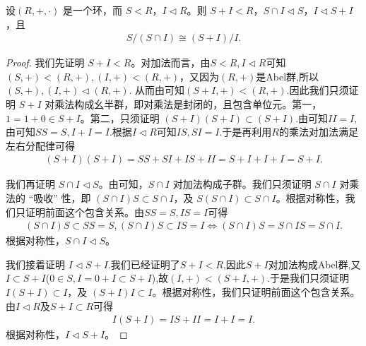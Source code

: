 \documentclass[../../main.tex]{subfiles}
\begin{document}
\begin{theorem}[环同构第二定理]\label{theorem:环同构第二定理}
设$(R, +, \cdot)$ 是一个环，而 $S < R$，$I \lhd R$。则 $S + I < R$，$S \cap I \lhd S$，$I \lhd S + I$，且
\begin{align*}
S / (S \cap I) \cong (S + I) / I.
\end{align*}
\end{theorem}
\begin{proof}
我们先证明 $S + I < R$。对加法而言，由$S<R,I\lhd R$可知$(S,+)< (R,+),(I,+)<(R,+)$，又因为$(R,+)$是Abel群,所以$(S,+),(I,+)\lhd (R,+)$.
从而由可知$(S+I,+)<(R,+)$.因此我们只须证明 $S + I$ 对乘法构成幺半群，即对乘法是封闭的，且包含单位元。第一，$1 = 1 + 0 \in S + I$。第二，只须证明 $(S + I)(S + I) \subset (S + I)$.由可知$II=I$,由可知$SS=S,I+I=I$.根据$I\lhd R$可知$IS,SI= I.$于是再利用$R$的乘法对加法满足左右分配律可得
\begin{align*}
(S + I)(S + I) = SS + SI + IS + II = S + I + I + I = S + I .
\end{align*}

我们再证明 $S \cap I \lhd S$。由可知，$S \cap I$ 对加法构成子群。我们只须证明 $S \cap I$ 对乘法的 “吸收” 性，即 $(S \cap I)S \subset S \cap I$，及 $S(S \cap I) \subset S \cap I$。根据对称性，我们只证明前面这个包含关系。由$SS=S,IS=I$可得
\begin{align*}
(S\cap I)S\subset SS=S,(S\cap I)S\subset IS=I
\Leftrightarrow
(S \cap I)S = S \cap IS = S \cap I .
\end{align*}
根据对称性，$S \cap I \lhd S$。

我们接着证明 $I \lhd S + I$.我们已经证明了$S+I<R$,因此$S+I$对加法构成Abel群,又$I\subset S+I$($0\in S,I=0+I\subset S+I$),故$(I,+)<(S+I,+)$.于是我们只须证明 $I(S + I) \subset I$，及 $(S + I)I \subset I$。根据对称性，我们只证明前面这个包含关系。由$I\lhd R$及$S+I\subset R$可得
\begin{align*}
I(S + I) = IS + II = I + I = I.
\end{align*}
根据对称性，$I \lhd S + I$。


\end{proof}
\end{document}
